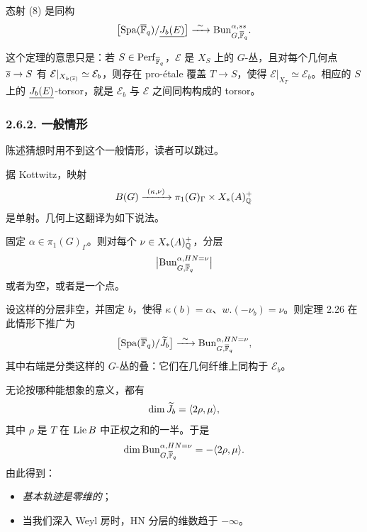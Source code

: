\begin{theorem}\label{thm:2.26}
态射 (8) 是同构
\[
\bigl[\Spa(\ol{\FF}_q)/\ul{J_b(E)}\bigr]\xrightarrow{\ \sim\ }\Bun^{\alpha,ss}_{G,\ol{\FF}_q}.
\]
\end{theorem}

这个定理的意思只是：若 $S\in \mathrm{Perf}_{\overline{\mathbb{F}}_q}$，$\mathcal{E}$ 是 $X_S$ 上的 $G$-丛，且对每个几何点 $\overline{s}\to S$ 有 $\mathcal{E}|_{X_{k(\overline{s})}}\simeq\mathcal{E}_b$，则存在 pro-étale 覆盖 $T\to S$，使得 $\mathcal{E}|_{X_T}\simeq\mathcal{E}_b$。相应的 $S$ 上的 $\underline{J_b(E)}$-torsor，就是 $\mathcal{E}_b$ 与 $\mathcal{E}$ 之间同构构成的 torsor。

\subsubsection*{2.6.2. 一般情形}%

陈述猜想时用不到这个一般情形，读者可以跳过。

据 Kottwitz，映射
\[
B(G)\xrightarrow{\ (\kappa,\nu)\ }\pi_1(G)_\Gamma\times X_*(A)^+_{\QQ}
\]
是单射。几何上这翻译为如下说法。

\begin{proposition}\label{prop:2.27}
固定 $\alpha\in\pi_1(G)_\Gamma$。则对每个 $\nu\in X_*(A)^+_{\mathbb{Q}}$，分层
\[
\bigl|\mathrm{Bun}^{\alpha,HN=\nu}_{G,\overline{\mathbb{F}}_q}\bigr|
\]
或者为空，或者是一个点。
\end{proposition}

设这样的分层非空，并固定 $b$，使得 $\kappa(b)=\alpha$、$w.(-\nu_b)=\nu$。则定理 2.26 在此情形下推广为
\[
\bigl[\Spa(\ol{\FF}_q)/\wt{J}_b\bigr]\xrightarrow{\ \sim\ }\Bun^{\alpha,HN=\nu}_{G,\ol{\FF}_q},
\]
其中右端是分类这样的 $G$-丛的叠：它们在几何纤维上同构于 $\mathcal{E}_b$。

无论按哪种能想象的意义，都有
\[
\dim\widetilde{J}_b=\langle 2\rho,\mu\rangle,
\]
其中 $\rho$ 是 $T$ 在 $\operatorname{Lie} B$ 中正权之和的一半。于是
\[
\dim\mathrm{Bun}^{\alpha,HN=\nu}_{G,\overline{\mathbb{F}}_q}=-\langle 2\rho,\mu\rangle.
\]
由此得到：
\begin{itemize}
\item \emph{基本轨迹是零维的}；
\item 当我们深入 Weyl 房时，HN 分层的维数趋于 $-\infty$。
\end{itemize}
